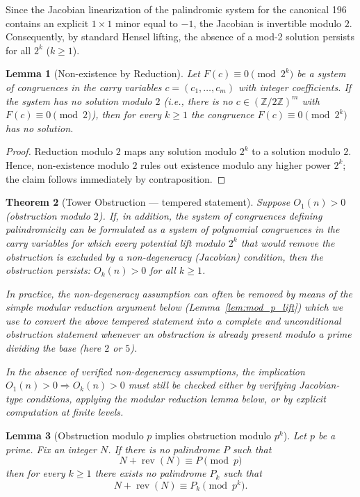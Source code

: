 \documentclass[12pt,a4paper]{article}
\newtheorem{theorem}{Theorem}[section]
\newtheorem{lemma}[theorem]{Lemma}
\begin{document}
Since the Jacobian linearization of the palindromic system for the canonical 196 contains an explicit $1 \times 1$ minor equal to $-1$, the Jacobian is invertible modulo $2$. Consequently, by standard Hensel lifting, the absence of a mod-2 solution persists for all $2^k$ ($k \geq 1$).

\begin{lemma}[Non-existence by Reduction]
\label{lem:reduction_nonexist-11}
Let $F(c) \equiv 0 \pmod{2^k}$ be a system of congruences in the carry variables $c = (c_1, \dots, c_m)$ with integer coefficients. If the system has no solution modulo $2$ (i.e., there is no $c \in (\mathbb{Z}/2\mathbb{Z})^m$ with $F(c) \equiv 0 \pmod{2}$), then for every $k \geq 1$ the congruence $F(c) \equiv 0 \pmod{2^k}$ has no solution.
\end{lemma}

\begin{proof}
Reduction modulo $2$ maps any solution modulo $2^k$ to a solution modulo $2$. Hence, non-existence modulo $2$ rules out existence modulo any higher power $2^k$; the claim follows immediately by contraposition.
\end{proof}

\begin{theorem}[Tower Obstruction — tempered statement]\label{thm:tower-11}
Suppose $O_1(n) > 0$ (obstruction modulo $2$). If, in addition, the system of congruences defining palindromicity can be formulated as a system of polynomial congruences in the carry variables for which every potential lift modulo $2^k$ that would remove the obstruction is excluded by a non-degeneracy (Jacobian) condition, then the obstruction persists: $O_k(n) > 0$ for all $k \geq 1$.

In practice, the non-degeneracy assumption can often be removed by means of the simple modular reduction argument below (Lemma~\ref{lem:mod_p_lift}) which we use to convert the above tempered statement into a complete and unconditional obstruction statement whenever an obstruction is already present modulo a prime dividing the base (here $2$ or $5$).

In the absence of verified non-degeneracy assumptions, the implication $O_1(n) > 0 \Rightarrow O_k(n) > 0$ must still be checked either by verifying Jacobian-type conditions, applying the modular reduction lemma below, or by explicit computation at finite levels.
\end{theorem}


\begin{lemma}[Obstruction modulo $p$ implies obstruction modulo $p^k$]
Let $p$ be a prime. Fix an integer $N$. If there is no palindrome $P$ such that
$$N+\operatorname{rev}(N)\equiv P\pmod p$$
then for every $k\ge1$ there exists no palindrome $P_k$ such that
$$N+\operatorname{rev}(N)\equiv P_k\pmod{p^k}.$$
\end{lemma}
\end{document}
